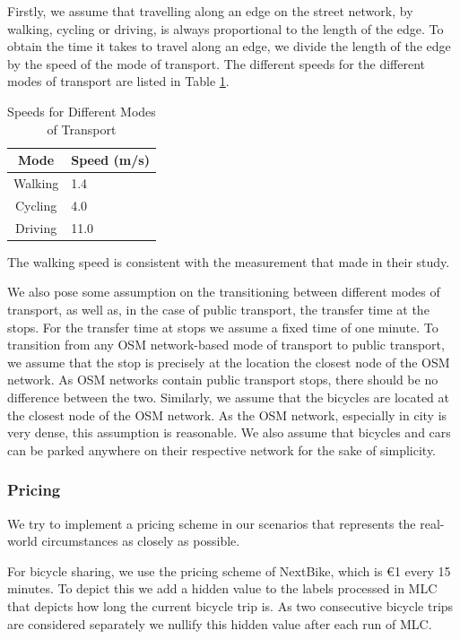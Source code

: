 Firstly, we assume that travelling along an edge on the street network, by walking, cycling or driving, is always proportional to the length of the edge.
To obtain the time it takes to travel along an edge, we divide the length of the edge by the speed of the mode of transport.
The different speeds for the different modes of transport are listed in Table \ref{table:speeds}.

\begin{table}[h]
\centering
\begin{tabular}{|c|l|}
\hline
\textbf{Mode} & \textbf{Speed (m/s)} \\
\hline
Walking & 1.4 \\
\hline
Cycling & 4.0 \\
\hline
Driving & 11.0 \\
\hline
\end{tabular}
\caption{Speeds for Different Modes of Transport}
\label{table:speeds}
\end{table}

The walking speed is consistent with the measurement that  made in their study.

We also pose some assumption on the transitioning between different modes of transport, as well as, in the case of public transport, the transfer time at the stops.
For the transfer time at stops we assume a fixed time of one minute.
To transition from any OSM network-based mode of transport to public transport, we assume that the stop is precisely at the location the closest node of the OSM network.
As OSM networks contain public transport stops, there should be no difference between the two.
Similarly, we assume that the bicycles are located at the closest node of the OSM network.
As the OSM network, especially in city is very dense, this assumption is reasonable.
We also assume that bicycles and cars can be parked anywhere on their respective network for the sake of simplicity.


\subsubsection{Pricing}
\label{subs:pricing}

We try to implement a pricing scheme in our scenarios that represents the real-world circumstances as closely as possible.

For bicycle sharing, we use the pricing scheme of NextBike, which is \euro{1} every 15 minutes.
To depict this we add a hidden value to the labels processed in MLC that depicts how long the current bicycle trip is.
As two consecutive bicycle trips are considered separately we nullify this hidden value after each run of MLC.

